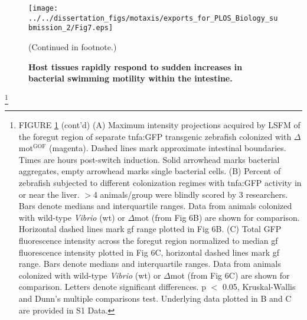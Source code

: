{{{{{{\begin{figure}%
	\centerline{
		\texttt{[image: ../../dissertation\_figs/motaxis/exports\_for\_PLOS\_Biology\_submission\_2/Fig7.eps]}}
	\caption{\textbf{Host tissues rapidly respond to sudden increases in bacterial swimming motility within the intestine.}}{(Continued in footnote.)}
	\label{fig:motaxis_fig7}
\end{figure}

{\let\thefootnote\relax\footnote{FIGURE \ref{fig:motaxis_fig7} (cont'd) (A) Maximum intensity projections acquired by LSFM of the foregut region of separate tnfa:GFP transgenic zebrafish colonized with $\Delta$mot$^{\text{GOF}}$ (magenta). Dashed lines mark approximate intestinal boundaries. Times are hours post-switch induction. Solid arrowhead marks bacterial aggregates, empty arrowhead marks single bacterial cells. (B) Percent of zebrafish subjected to different colonization regimes with tnfa:GFP activity in or near the liver. $ > $4 animals/group were blindly scored by 3 researchers. Bars denote medians and interquartile ranges. Data from animals colonized with wild-type \textit{Vibrio} (wt) or $\Delta$mot (from Fig 6B) are shown for comparison. Horizontal dashed lines mark gf range plotted in Fig 6B. (C) Total GFP fluorescence intensity across the foregut region normalized to median gf fluorescence intensity plotted in Fig 6C, horizontal dashed lines mark gf range. Bars denote medians and interquartile ranges. Data from animals colonized with wild-type \textit{Vibrio} (wt) or $\Delta$mot (from Fig 6C) are shown for comparison. Letters denote significant differences. p $ < $ 0.05, Kruskal-Wallis and Dunn's multiple comparisons test. Underlying data plotted in B and C are provided in S1 Data.}

}}}}}}}

